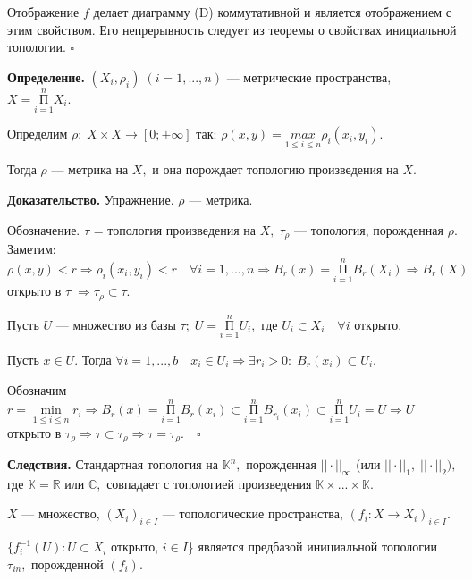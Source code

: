\documentclass[12pt,a4paper]{article}
\begin{document}
Отображение $f$ делает диаграмму (D) коммутативной и является отображением с этим свойством. Его непрерывность следует из теоремы о свойствах инициальной топологии. $\square$

\textbf{Определение.} $(X_{i}, \rho_{i}) \; (i = 1, ..., n)$ --- метрические пространства, $X = \underset{i = 1}{\overset{n}{\text{П}}} X_{i}.$ 

Определим $\rho: \; X \times X \to [0; +\infty]$ так: $\rho(x, y) = \underset{1 \leq i \leq n}{max} \rho_{i} (x_{i}, y_{i}).$ 

Тогда $\rho$ --- метрика на $X,$ и она порождает топологию произведения на $X.$ 

\textbf{Доказательство.} Упражнение. $\rho$ --- метрика. 

Обозначение. $\tau$ = топология произведения на $X, \; \tau_{\rho}$ --- топология, порожденная $\rho.$ Заметим: $\rho(x, y) < r \Rightarrow \rho_{i} (x_{i}, y_{i}) < r \quad \forall i = 1, ..., n \Rightarrow B_{r} (x) = \underset{i = 1}{\overset{n}{\text{П}}} B_{r}(X_{i}) \Rightarrow B_{r} (X)$ открыто в $\tau \; \Rightarrow \tau_{\rho} \subset \tau.$ 

Пусть $U$ --- множество из базы $\tau; \; U = \underset{i = 1}{\overset{n}{\text{П}}} U_{i},$ где $U_{i} \subset X_{i} \quad \forall i$ открыто. 

Пусть $x \in U.$ Тогда $\forall i = 1, ..., b \quad x_{i} \in U_{i} \Rightarrow \exists r_{i} > 0: \; B_{r}(x_{i}) \subset U_{i}.$ 

Обозначим $r = \underset{1 \leq i \leq n}{\min} r_{i} \Rightarrow B_{r}(x) = \underset{i = 1}{\overset{n}{\text{П}}} B_{r} (x_{i}) \subset \underset{i = 1}{\overset{n}{\text{П}}} B_{r_{i}} (x_{i}) \subset \underset{i = 1}{\overset{n}{\text{П}}} U_{i} = U \Rightarrow U$ открыто в $\tau_{\rho} \Rightarrow \tau \subset \tau_{\rho} \Rightarrow \tau = \tau_{\rho}. \quad \square$ 

\textbf{Следствия.} Стандартная топология на $\mathbb{K}^{n},$ порожденная $|| \cdot ||_{\infty}$ (или $|| \cdot||_{1}, \; || \cdot ||_{2}),$ где $\mathbb{K} = \mathbb{R}$ или $\mathbb{C},$ совпадает с топологией произведения $\mathbb{K} \times ... \times \mathbb{K}.$ 

$X$ --- множество, $(X_{i})_{i \in I}$ --- топологические пространства, $(f_{i}: X \to X_{i})_{i \in I}.$ 

$\{f_{i}^{-1}(U)\!: U \subset X_{i}$ открыто, $i \in I$\} является предбазой инициальной топологии $\tau_{in},$ порожденной $(f_{i}).$ 
\end{document}
